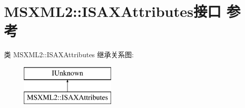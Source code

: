 \hypertarget{interface_m_s_x_m_l2_1_1_i_s_a_x_attributes}{}\section{M\+S\+X\+M\+L2\+:\+:I\+S\+A\+X\+Attributes接口 参考}
\label{interface_m_s_x_m_l2_1_1_i_s_a_x_attributes}
类 M\+S\+X\+M\+L2\+:\+:I\+S\+A\+X\+Attributes 继承关系图\+:\begin{figure}[H]
\begin{center}
\leavevmode
\includegraphics[height=2.000000cm]{interface_m_s_x_m_l2_1_1_i_s_a_x_attributes}
\end{center}
\end{figure}
